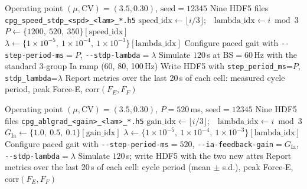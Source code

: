 \begin{algorithm}[h]
\caption{Phase A --- speed $\times$ STDP learning rate matrix.}\label{alg:speed_stdp}
\begin{algorithmic}[1]
\Require Operating point $(\mu, \mathrm{CV}) = (3.5, 0.30)$, $\mathrm{seed} = 12345$
\Ensure Nine HDF5 files \texttt{cpg\_speed\_stdp\_<spd>\_<lam>\_*.h5}
  \State $\mathrm{speed\_idx} \gets \lfloor i / 3 \rfloor$;\ \ $\mathrm{lambda\_idx} \gets i \bmod 3$
  \State $P \gets \{1200,\ 520,\ 350\}[\mathrm{speed\_idx}]$ 
  \State $\lambda \gets \{1{\times}10^{-5},\ 1{\times}10^{-4},\ 1{\times}10^{-3}\}[\mathrm{lambda\_idx}]$
  \State Configure paced gait with \verb|--step-period-ms|$=P$,
         \verb|--stdp-lambda|$=\lambda$
  \State Simulate $120$\,s at BS$=60$\,Hz with the standard 3-group Ia
         ramp (60, 80, 100\,Hz)
  \State Write HDF5 with \texttt{step\_period\_ms}=$P$, \texttt{stdp\_lambda}=$\lambda$
\EndFor
\State Report metrics over the last 20\,s of each cell: measured cycle
       period, peak Force-E, $\mathrm{corr}(F_E, F_F)$
\end{algorithmic}
\end{algorithm}

\begin{algorithm}[h]
\caption{Phase B --- graded Ia ablation $\times$ STDP learning rate
matrix (SCI-rehab paradigm).}\label{alg:ablgrad}
\begin{algorithmic}[1]
\Require Operating point $(\mu, \mathrm{CV}) = (3.5, 0.30)$,
$P=520$\,ms, $\mathrm{seed} = 12345$
\Ensure Nine HDF5 files \texttt{cpg\_ablgrad\_<gain>\_<lam>\_*.h5}
  \State $\mathrm{gain\_idx} \gets \lfloor i / 3 \rfloor$;\ \ $\mathrm{lambda\_idx} \gets i \bmod 3$
  \State $G_{\text{Ia}} \gets \{1.0,\ 0.5,\ 0.1\}[\mathrm{gain\_idx}]$
  \State $\lambda \gets \{1{\times}10^{-5},\ 1{\times}10^{-4},\ 1{\times}10^{-3}\}[\mathrm{lambda\_idx}]$
  \State Configure paced gait with \verb|--step-period-ms|$=520$,
         \verb|--ia-feedback-gain|$=G_{\text{Ia}}$, \verb|--stdp-lambda|$=\lambda$
  \State Simulate $120$\,s; write HDF5 with the two new attrs
\EndFor
\State Report metrics over the last 20\,s of each cell: cycle period
       (mean $\pm$ s.d.), peak Force-E, $\mathrm{corr}(F_E, F_F)$
\end{algorithmic}
\end{algorithm}

